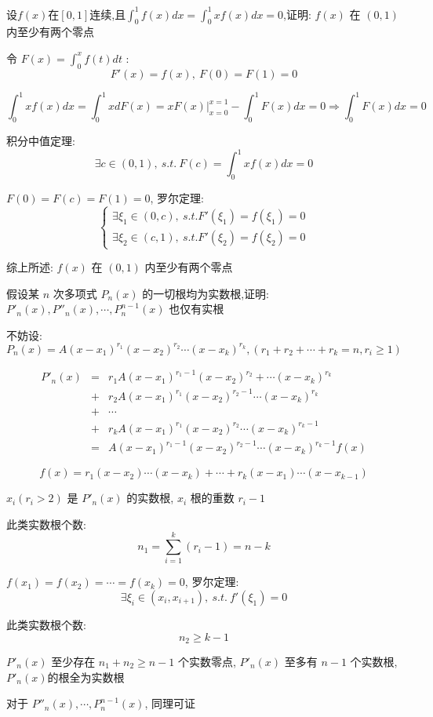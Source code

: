 \begin{proposition}
	设$f(x)$在$[0,1]$连续,且$\displaystyle{\int_{0}^{1}f(x)dx=\int_{0}^{1}xf(x)dx=0}$,证明: $f(x)$ 在 $(0,1)$ 内至少有两个零点
\end{proposition}
\begin{solution}

	令 $F(x)=\int_{0}^{x}f(t)dt$ :
	$$F'(x)=f(x),\ F(0)=F(1)=0$$

	$$\int_{0}^{1}xf(x)dx=\int_{0}^{1}xdF(x)=xF(x)|_{x=0}^{x=1}-\int_{0}^{1}F(x)dx=0\Rightarrow \int_{0}^{1}F(x)dx=0$$

	积分中值定理:
	$$\exists c\in(0,1),\ s.t.\ F(c)=\int_{0}^{1}xf(x)dx=0$$

	$F(0)=F(c)=F(1)=0$, 罗尔定理:
	$$\begin{cases}
		\exists \xi_{1}\in(0,c),\ s.t. F'(\xi_{1})=f(\xi_{1})=0 \\
		\exists \xi_{2}\in(c,1),\ s.t. F'(\xi_{2})=f(\xi_{2})=0
	\end{cases}$$

	综上所述: $f(x)$ 在 $(0,1)$ 内至少有两个零点
\end{solution}

\begin{proposition}
	假设某 $n$ 次多项式 $P_{n}(x)$ 的一切根均为实数根,证明: $P'_{n}(x),P''_{n}(x),\cdots,P_{n}^{n-1}(x)$ 也仅有实根
\end{proposition}
\begin{solution}

	不妨设:
	$$P_{n}(x)=A(x-x_{1})^{r_{1}}(x-x_{2})^{r_{2}}\cdots(x-x_{k})^{r_{k}},(r_{1}+r_{2}+\cdots+r_{k}=n, r_{i}\geq 1)$$

	\begin{eqnarray*}
		P'_{n}(x) & = & r_{1}A(x-x_{1})^{r_{1}-1}(x-x_{2})^{r_{2}}+\cdots(x-x_{k})^{r_{k}}\\
		          & + & r_{2}A(x-x_{1})^{r_{1}}(x-x_{2})^{r_{2}-1}\cdots(x-x_{k})^{r_{k}}\\
		          & + & \cdots\\
		          & + & r_{k}A(x-x_{1})^{r_{1}}(x-x_{2})^{r_{2}}\cdots(x-x_{k})^{r_{k}-1}\\
		          & = & A(x-x_{1})^{r_{1}-1}(x-x_{2})^{r_{2}-1}\cdots(x-x_{k})^{r_{k}-1}f(x)
	\end{eqnarray*}

	$$f(x) = r_{1}(x-x_{2})\cdots(x-x_{k})+\cdots+r_{k}(x-x_{1})\cdots(x-x_{k-1})$$

	$x_{i}(r_{i} > 2)$ 是 $P'_{n}(x)$ 的实数根, $x_{i}$ 根的重数 $r_{i} - 1$
	
	此类实数根个数:
	$$n_{1} = \sum\limits_{i = 1}^{k}(r_{i}-1) = n - k$$

	$f(x_{1}) = f(x_{2}) = \cdots = f(x_{k}) = 0$, 罗尔定理:
	$$\exists \xi_{i}\in (x_{i},x_{i+1}),\ s.t.\ f'(\xi_{1}) = 0$$

	此类实数根个数:
	$$n_{2} \geq k -1$$

	$P'_{n}(x)$ 至少存在 $n_{1} + n_{2} \geq n -1$ 个实数零点, $P'_{n}(x)$ 至多有 $n-1$ 个实数根, $P'_{n}(x)$的根全为实数根

	对于 $P''_{n}(x),\cdots,P_{n}^{n-1}(x)$, 同理可证

\end{solution}


